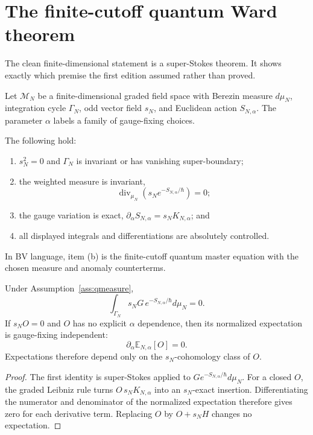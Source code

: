 \documentclass[11pt]{article}
\newcommand{\bbE}{\mathbb E}
\begin{document}
\section{The finite-cutoff quantum Ward theorem}

The clean finite-dimensional statement is a super-Stokes theorem.  It shows
exactly which premise the first edition assumed rather than proved.

Let $\mathcal M_N$ be a finite-dimensional graded field space with Berezin
measure $d\mu_N$, integration cycle $\Gamma_N$, odd vector field $s_N$, and
Euclidean action $S_{N,\alpha}$.  The parameter $\alpha$ labels a family of
gauge-fixing choices.

\begin{assumption}\label{ass:qmeasure}
The following hold:
\begin{enumerate}[label=\textup{(\alph*)}]
\item $s_N^2=0$ and $\Gamma_N$ is invariant or has vanishing super-boundary;
\item the weighted measure is invariant,
\[
 \operatorname{div}_{\mu_N}\!\left(s_Ne^{-S_{N,\alpha}/\hbar}\right)=0;
\]
\item the gauge variation is exact,
$\partial_\alpha S_{N,\alpha}=s_NK_{N,\alpha}$; and
\item all displayed integrals and differentiations are absolutely controlled.
\end{enumerate}
In BV language, item (b) is the finite-cutoff quantum master equation with the
chosen measure and anomaly counterterms.
\end{assumption}

\begin{theorem}\label{thm:ward}
Under Assumption~\ref{ass:qmeasure},
\[
 \int_{\Gamma_N}s_NG\,e^{-S_{N,\alpha}/\hbar}d\mu_N=0.
\]
If $s_NO=0$ and $O$ has no explicit $\alpha$ dependence, then its normalized
expectation is gauge-fixing independent:
\[
 \partial_\alpha\bbE_{N,\alpha}[O]=0.
\]
Expectations therefore depend only on the $s_N$-cohomology class of $O$.
\end{theorem}

\begin{proof}
The first identity is super-Stokes applied to
$G e^{-S_{N,\alpha}/\hbar}d\mu_N$.  For a closed $O$, the graded Leibniz rule
turns $O\,s_NK_{N,\alpha}$ into an $s_N$-exact insertion.  Differentiating the
numerator and denominator of the normalized expectation therefore gives zero
for each derivative term.  Replacing $O$ by $O+s_NH$ changes no expectation.
\end{proof}
\end{document}
